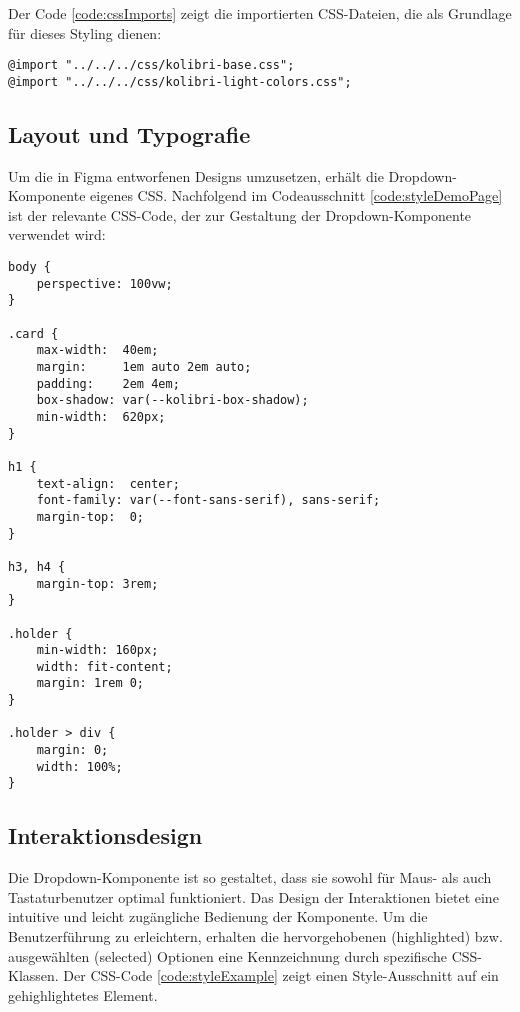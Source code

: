Der Code \ref{code:cssImports} zeigt die importierten CSS-Dateien, die als Grundlage für dieses Styling dienen:

\begin{lstlisting}[style = htmlcssjs, caption = CSS Imports, label = code:cssImports]
@import "../../../css/kolibri-base.css";
@import "../../../css/kolibri-light-colors.css";
\end{lstlisting}


\subsection{Layout und Typografie}

Um die in Figma entworfenen Designs umzusetzen, erhält die Dropdown-Komponente eigenes CSS.
Nachfolgend im Codeausschnitt \ref{code:styleDemoPage} ist der relevante CSS-Code, der zur Gestaltung der Dropdown-Komponente verwendet wird:

\begin{lstlisting}[style = htmlcssjs, caption = style.css der Demo-Page, label = code:styleDemoPage]
body {
    perspective: 100vw;
}

.card {
    max-width:  40em;
    margin:     1em auto 2em auto;
    padding:    2em 4em;
    box-shadow: var(--kolibri-box-shadow);
    min-width:  620px;
}

h1 {
    text-align:  center;
    font-family: var(--font-sans-serif), sans-serif;
    margin-top:  0;
}

h3, h4 {
    margin-top: 3rem;
}

.holder {
    min-width: 160px;
    width: fit-content;
    margin: 1rem 0;
}

.holder > div {
    margin: 0;
    width: 100%;
}
\end{lstlisting}


\subsection{Interaktionsdesign}

Die Dropdown-Komponente ist so gestaltet, dass sie sowohl für Maus- als auch Tastaturbenutzer optimal funktioniert. 
Das Design der Interaktionen bietet eine intuitive und leicht zugängliche Bedienung der Komponente.
Um die Benutzerführung zu erleichtern, erhalten die hervorgehobenen (highlighted) bzw. ausgewählten (selected) Optionen eine Kennzeichnung durch spezifische CSS-Klassen.
Der CSS-Code \ref{code:styleExample} zeigt einen Style-Ausschnitt auf ein gehighlightetes Element.

